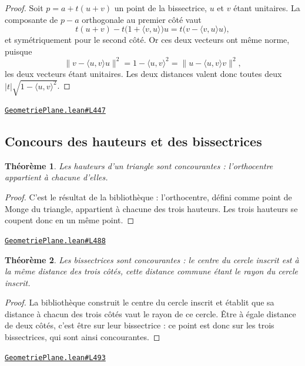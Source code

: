 \documentclass[11pt,a4paper]{article}
\theoremstyle{definition}
\theoremstyle{plain}
\newtheorem{theoreme}{Théorème}
\newcommand{\source}[2]{\par\smallskip\noindent\hfill{\footnotesize\href{#1}{\texttt{#2}}}\par\smallskip}
\begin{document}
\begin{proof}
Soit $p = a + t(u + v)$ un point de la bissectrice, $u$ et $v$ étant unitaires. La
composante de $p - a$ orthogonale au premier côté vaut
\[ t(u+v) - t\bigl(1 + \langle v, u\rangle\bigr)u = t\bigl(v - \langle v, u\rangle u\bigr) , \]
et symétriquement pour le second côté. Or ces deux vecteurs ont même norme, puisque
\[ \|v - \langle u,v\rangle u\|^2 = 1 - \langle u,v\rangle^2
   = \|u - \langle u,v\rangle v\|^2 , \]
les deux vecteurs étant unitaires. Les deux distances valent donc toutes deux
$|t|\sqrt{1 - \langle u,v\rangle^2}$.
\end{proof}
\source{https://github.com/Commutator-IO/learn-lean/blob/main/cours/01-college/02-geometrie-plane/GeometriePlane.lean\#L447}{GeometriePlane.lean\#L447}

\subsection{Concours des hauteurs et des bissectrices}

\begin{theoreme}
Les hauteurs d'un triangle sont concourantes : l'orthocentre appartient à chacune
d'elles.
\end{theoreme}

\begin{proof}
C'est le résultat de la bibliothèque : l'orthocentre, défini comme point de Monge du
triangle, appartient à chacune des trois hauteurs. Les trois hauteurs se coupent donc en
un même point.
\end{proof}
\source{https://github.com/Commutator-IO/learn-lean/blob/main/cours/01-college/02-geometrie-plane/GeometriePlane.lean\#L488}{GeometriePlane.lean\#L488}

\begin{theoreme}
Les bissectrices sont concourantes : le centre du cercle inscrit est à la même distance
des trois côtés, cette distance commune étant le rayon du cercle inscrit.
\end{theoreme}

\begin{proof}
La bibliothèque construit le centre du cercle inscrit et établit que sa distance à
chacun des trois côtés vaut le rayon de ce cercle. Être à égale distance de deux côtés,
c'est être sur leur bissectrice : ce point est donc sur les trois bissectrices, qui sont
ainsi concourantes.
\end{proof}
\source{https://github.com/Commutator-IO/learn-lean/blob/main/cours/01-college/02-geometrie-plane/GeometriePlane.lean\#L493}{GeometriePlane.lean\#L493}
\end{document}
